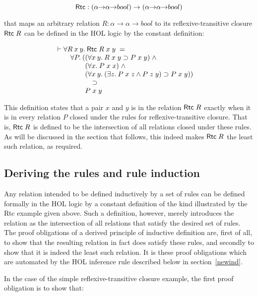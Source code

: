 \documentclass[twocolumn,fleqn,layout]{article}
\begin{document}
\[ {\sf Rtc} : (\alpha{\rightarrow}\alpha{\rightarrow}bool) \rightarrow
(\alpha{\rightarrow}\alpha{\rightarrow}bool) \]

\noindent that maps an arbitrary relation $R :
\alpha{\rightarrow}\alpha{\rightarrow}bool$ to its reflexive-transitive closure
${\sf Rtc}\;R$ can be defined in the {\small HOL} logic by the constant
definition:

\[\vdash \begin{array}[t]{@{}l}
\forall R\:x\:y.\:{\sf Rtc}\;R\;x\;y\;= \\
\quad\forall P.\:(\begin{array}[t]{@{}l}
  (\forall x\: y.\:R\;x\;y \supset P\;x\;y)\; \wedge \\
  (\forall x.\:P\;x\;x)\; \wedge \\
  (\forall x\: y.\:(\exists z.\:P\;x\;z \wedge P\;z\;y) \supset P\;x\;y)) \\
\quad\supset\\
P\;x\;y
\end{array}\end{array}\]

\noindent This definition states that a pair $x$ and $y$ is in the relation
${\sf Rtc}\;R$ exactly when it is in every relation $P$ closed under the rules
for reflexive-transitive closure. That is, ${\sf Rtc}\;R$ is \mbox{defined} to
be the intersection of all relations closed under these rules.  As will be
discussed in the section that follows, this indeed makes ${\sf Rtc}\;R$ the
least such relation, as required.


\subsection{Deriving the rules and rule induction}

Any relation intended to be defined inductively by a set of rules can be
defined formally in the {\small HOL} logic by a constant definition of the kind
illustrated by the {\sf Rtc} example given above.  Such a definition, however,
merely introduces the relation as the intersection of all relations that
satisfy the desired set of rules.  The proof obligations of a derived principle
of inductive definition are, first of all, to show that the resulting relation
in fact does satisfy these rules, and secondly to show that it is indeed the
least such relation.  It is these proof obligations which are automated by the
{\small HOL} inference rule described below in section~\ref{newind}.

In the case of the simple reflexive-transitive closure example, the first proof
obligation is to show that:
\end{document}
